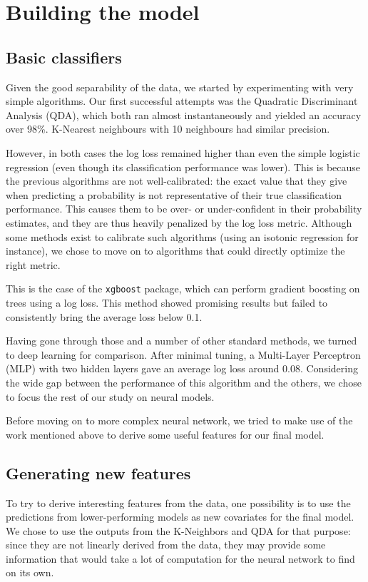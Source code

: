 \documentclass[a4paper,11pt,openany,extrafontsizes,oneside,article,twocolumn]{memoir}
\begin{document}
\chapter{Building the model}

\section{Basic classifiers}

Given the good separability of the data, we started by experimenting
with very simple algorithms. Our first successful attempts was the
Quadratic Discriminant Analysis (QDA), which both ran almost
instantaneously and yielded an accuracy over 98\%. K-Nearest
neighbours with 10 neighbours had similar precision.

However, in both cases the log loss remained higher than even the
simple logistic regression (even though its classification performance
was lower). This is because the previous algorithms are not
well-calibrated: the exact value that they give when predicting a
probability is not representative of their true classification
performance. This causes them to be over- or under-confident in their
probability estimates, and they are thus heavily penalized by the log
loss metric. Although some methods exist to calibrate such algorithms
(using an isotonic regression for instance), we chose to move on to
algorithms that could directly optimize the right metric.

This is the case of the \texttt{xgboost} package, which can perform
gradient boosting on trees using a log loss. This method showed
promising results but failed to consistently bring the average loss
below 0.1.

Having gone through those and a number of other standard methods, we
turned to deep learning for comparison. After minimal tuning, a
Multi-Layer Perceptron (MLP) with two hidden layers gave an average
log loss around 0.08. Considering the wide gap between the performance
of this algorithm and the others, we chose to focus the rest of our
study on neural models.

Before moving on to more complex neural network, we tried to make use
of the work mentioned above to derive some useful features for our
final model.

\section{Generating new features}

To try to derive interesting features from the data, one possibility
is to use the predictions from lower-performing models as new
covariates for the final model. We chose to use the outputs from the
K-Neighbors and QDA for that purpose: since they are not linearly
derived from the data, they may provide some information that would
take a lot of computation for the neural network to find on its own.
\end{document}
